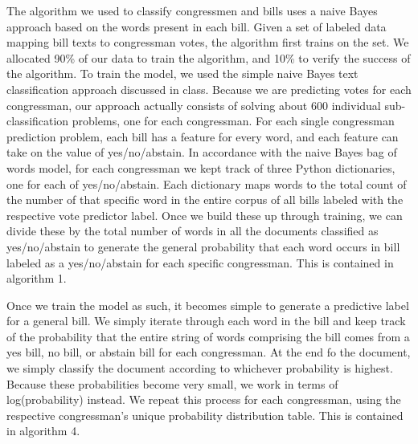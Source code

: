 \documentclass[11pt]{article}
\begin{document}
The algorithm we used to classify congressmen and bills uses a naive Bayes approach based on the words present in each bill. Given a set of labeled data mapping bill texts to congressman votes, the algorithm first trains on the set. We allocated 90\% of our data to train the algorithm, and 10\% to verify the success of the algorithm. To train the model, we used the simple naive Bayes text classification approach discussed in class. Because we are predicting votes for each congressman, our approach actually consists of solving about 600 individual sub-classification problems, one for each congressman. For each single congressman prediction problem, each bill has a feature for every word, and each feature can take on the value of yes/no/abstain. In accordance with the naive Bayes bag of words model, for each congressman we kept track of three Python dictionaries, one for each of yes/no/abstain. Each dictionary maps words to the total count of the number of that specific word in the entire corpus of all bills labeled with the respective vote predictor label. Once we build these up through training, we can divide these by the total number of words in all the documents classified as yes/no/abstain to generate the general probability that each word occurs in bill labeled as a yes/no/abstain for each specific congressman. This is contained in algorithm 1.

Once we train the model as such, it becomes simple to generate a predictive label for a general bill. We simply iterate through each word in the bill and keep track of the probability that the entire string of words comprising the bill comes from a yes bill, no bill, or abstain bill for each congressman. At the end fo the document, we simply classify the document according to whichever probability is highest. Because these probabilities become very small, we work in terms of log(probability) instead. We repeat this process for each congressman, using the respective congressman's unique probability distribution table. This is contained in algorithm 4.
\end{document}
